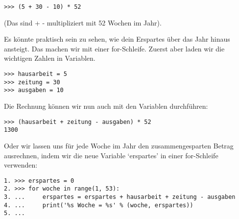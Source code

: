 \begin{Verbatim}[frame=single]
>>> (5 + 30 - 10) * 52
\end{Verbatim}

\noindent
(Das sind  +  -  multipliziert mit 52 Wochen im Jahr).

Es könnte praktisch sein zu sehen, wie dein Erspartes über das Jahr hinaus ansteigt. Das machen wir mit einer for-Schleife. Zuerst aber laden wir die wichtigen Zahlen in Variablen.

\begin{Verbatim}[frame=single]
>>> hausarbeit = 5
>>> zeitung = 30
>>> ausgaben = 10
\end{Verbatim}

Die Rechnung können wir nun auch mit den Variablen durchführen:

\begin{Verbatim}[frame=single]
>>> (hausarbeit + zeitung - ausgaben) * 52
1300
\end{Verbatim}

Oder wir lassen uns für jede Woche im Jahr den zusammengesparten Betrag ausrechnen, indem wir die neue Variable `erspartes' in einer for-Schleife verwenden:

\begin{Verbatim}[frame=single]
1. >>> erspartes = 0
2. >>> for woche in range(1, 53):
3. ...     erspartes = erspartes + hausarbeit + zeitung - ausgaben
4. ...     print('%s Woche = %s' % (woche, erspartes))
5. ...
\end{Verbatim}

